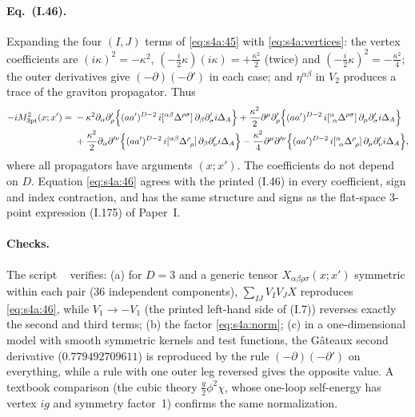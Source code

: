\documentclass[aps,prd,onecolumn,10pt,nofootinbib,floatfix]{revtex4-2}
\newcommand{\PI}{Paper~I}
\newcommand{\eqI}[1]{(I.#1)}
\begin{document}
\paragraph*{Eq.~(I.46).}
Expanding the four $(I,J)$ terms of \eqref{eq:s4a:45} with \eqref{eq:s4a:vertices}: the vertex
coefficients are $(i\kappa)^2=-\kappa^2$, $(-\frac i2\kappa)(i\kappa)=+\frac{\kappa^2}2$ (twice) and
$(-\frac i2\kappa)^2=-\frac{\kappa^2}4$; the outer derivatives give $(-\partial)(-\partial')$ in each case; and
$\eta^{\alpha\beta}$ in $V_2$ produces a trace of the graviton propagator. Thus
\begin{equation}
\begin{aligned}
-iM^2_{\rm 3pt}(x;x')={}&-\kappa^2\partial_\alpha\partial'_\rho\Big\{(aa')^{D-2}\,i[{}^{\alpha\beta}\Delta^{\rho\sigma}]\,\partial_\beta\partial'_\sigma i\Delta_A\Big\}
+\frac{\kappa^2}2\partial^\mu\partial'_\rho\Big\{(aa')^{D-2}\,i[{}^\alpha_{\ \alpha}\Delta^{\rho\sigma}]\,\partial_\mu\partial'_\sigma i\Delta_A\Big\}\\
&+\frac{\kappa^2}2\partial_\alpha\partial'^\nu\Big\{(aa')^{D-2}\,i[{}^{\alpha\beta}\Delta^\rho_{\ \rho}]\,\partial_\beta\partial'_\nu i\Delta_A\Big\}
-\frac{\kappa^2}4\partial^\mu\partial'^\nu\Big\{(aa')^{D-2}\,i[{}^\alpha_{\ \alpha}\Delta^\rho_{\ \rho}]\,\partial_\mu\partial'_\nu i\Delta_A\Big\},
\end{aligned}
\label{eq:s4a:46}
\end{equation}
where all propagators have arguments $(x;x')$. The coefficients do not depend on $D$. Equation
\eqref{eq:s4a:46} agrees with the printed \eqI{46} in every coefficient, sign and index contraction,
and has the same structure and signs as the flat-space 3-point expression \eqI{175} of \PI.

\paragraph*{Checks.}
The script ~\cite{ref:repo} verifies:
(a) for $D=3$ and a generic tensor $X_{\alpha\beta\rho\sigma}(x;x')$ symmetric within each pair
(36 independent components), $\sum_{IJ}V_IV_JX$ reproduces \eqref{eq:s4a:46}, while $V_1\to-V_1$
(the printed left-hand side of \eqI{7}) reverses exactly the second and third terms;
(b) the factor \eqref{eq:s4a:norm};
(c) in a one-dimensional model with smooth symmetric kernels and test functions, the G\^ateaux second
derivative ($0.779492709611$) is reproduced by the rule $(-\partial)(-\partial')$ on everything, while
a rule with one outer leg reversed gives the opposite value.
A textbook comparison (the cubic theory $\frac g2\phi^2\chi$, whose one-loop self-energy has vertex
$ig$ and symmetry factor~1) confirms the same normalization.
\end{document}
